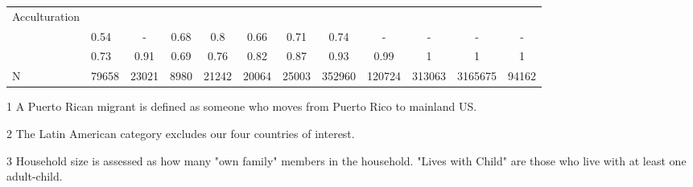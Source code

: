 \documentclass[
]{article}
\begin{document}
\begin{landscape}
\begin{table}[ht]
\begin{threeparttable}
\begin{tabular}{>{\raggedright\arraybackslash}p{3.2cm}|lcccccc|cccc}
  Acculturation &  &  &  &  &  &  &  &  &  &  &  \\ 
  \multicolumn{1}{>{\raggedleft\arraybackslash}p{1.6cm}|}{\makebox[1.6cm][r]{Citizen }}& 0.54 & - & 0.68 & 0.8 & 0.66 & 0.71 & 0.74 & - & - & - & - \\ 
  \multicolumn{1}{>{\raggedleft\arraybackslash}p{3cm}|}{\makebox[3cm][r]{English Speakers }}& 0.73 & 0.91 & 0.69 & 0.76 & 0.82 & 0.87 & 0.93 & 0.99 & 1 & 1 & 1 \\ 
  N & 79658 & 23021 & 8980 & 21242 & 20064 & 25003 & 352960 & 120724 & 313063 & 3165675 & 94162 \\ 
   \hline
\end{tabular}
\endgroup
\begin{tablenotes}
\item[1] A Puerto Rican migrant is defined as someone who moves from Puerto Rico to mainland US.
\item[2] The Latin American category excludes our four countries of interest.
\item[3] Household size is assessed as how many "own family" members in the household. "Lives with Child" are those who live with at least one adult-child.
\end{tablenotes}
\end{threeparttable}
\end{table}



\end{landscape}
\end{document}
